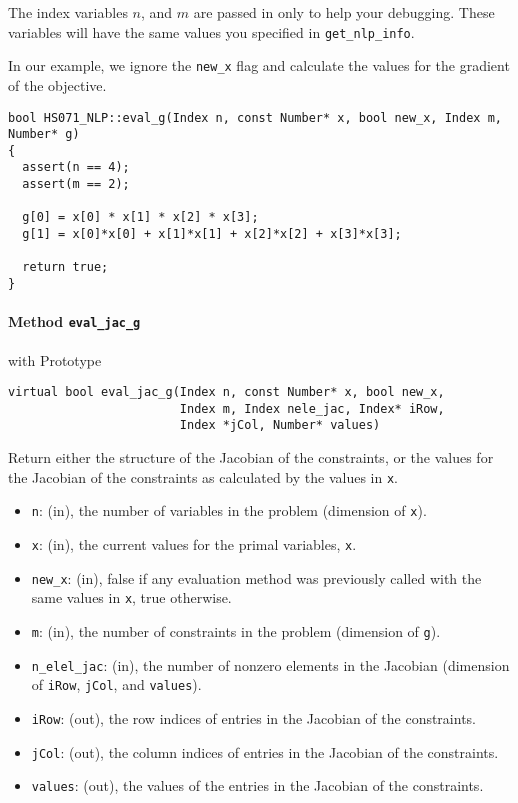 \documentclass[letter,10pt]{article}
\begin{document}
The index variables $n$, and $m$ are passed in only to help your
debugging. These variables will have the same values you specified in
{\tt get\_nlp\_info}.

In our example, we ignore the {\tt new\_x} flag and calculate the
values for the gradient of the objective.
\begin{footnotesize}
\begin{verbatim}
bool HS071_NLP::eval_g(Index n, const Number* x, bool new_x, Index m, Number* g)
{
  assert(n == 4);
  assert(m == 2);

  g[0] = x[0] * x[1] * x[2] * x[3];
  g[1] = x[0]*x[0] + x[1]*x[1] + x[2]*x[2] + x[3]*x[3];

  return true;
} 
\end{verbatim}
\end{footnotesize}

\paragraph{Method {\texttt{eval\_jac\_g}}} with Prototype
\begin{verbatim}
virtual bool eval_jac_g(Index n, const Number* x, bool new_x,
                        Index m, Index nele_jac, Index* iRow, 
                        Index *jCol, Number* values)
\end{verbatim}
Return either the structure of the Jacobian of the constraints, or the values for the 
Jacobian of the constraints as calculated by the values in {\tt x}.
\begin{itemize}
\item {\tt n}: (in), the number of variables in the problem (dimension of {\tt x}). 
\item {\tt x}: (in), the current values for the primal variables, {\tt x}.
\item {\tt new\_x}: (in), false if any evaluation method was previously called 
        with the same values in {\tt x}, true otherwise.
\item {\tt m}: (in), the number of constraints in the problem (dimension of {\tt g}).
\item {\tt n\_elel\_jac}: (in), the number of nonzero elements in the 
        Jacobian (dimension of {\tt iRow}, {\tt jCol}, and {\tt values}).
\item {\tt iRow}: (out), the row indices of entries in the Jacobian of the constraints.
\item {\tt jCol}: (out), the column indices of entries in the Jacobian of the constraints.
\item {\tt values}: (out), the values of the entries in the Jacobian of the constraints.
\end{itemize}
\end{document}
